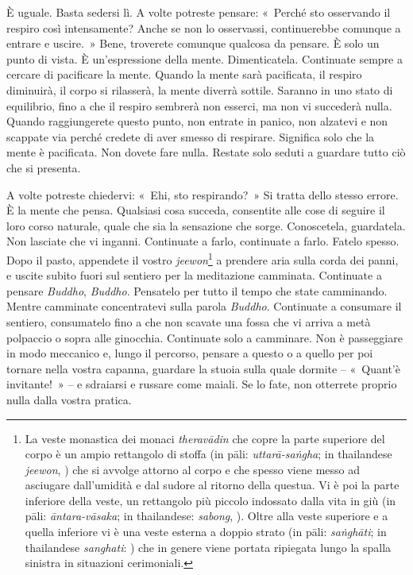 È uguale. Basta sedersi lì. A volte potreste pensare: «~Perché sto
osservando il respiro così intensamente? Anche se non lo osservassi,
continuerebbe comunque a entrare e uscire.~» Bene, troverete comunque
qualcosa da pensare. È solo un punto di vista. È un'espressione della
mente. Dimenticatela. Continuate sempre a cercare di pacificare la
mente. Quando la mente sarà pacificata, il respiro diminuirà, il corpo
si rilasserà, la mente diverrà sottile. Saranno in uno stato di
equilibrio, fino a che il respiro sembrerà non esserci, ma non vi
succederà nulla. Quando raggiungerete questo punto, non entrate in
panico, non alzatevi e non scappate via perché credete di aver smesso di
respirare. Significa solo che la mente è pacificata. Non dovete fare
nulla. Restate solo seduti a guardare tutto ciò che si presenta.

A volte potreste chiedervi: «~Ehi, sto respirando?~» Si tratta dello
stesso errore. È la mente che pensa. Qualsiasi cosa succeda, consentite
alle cose di seguire il loro corso naturale, quale che sia la sensazione
che sorge. Conoscetela, guardatela. Non lasciate che vi inganni.
Continuate a farlo, continuate a farlo. Fatelo spesso. Dopo il pasto,
appendete il vostro \emph{jeewon}\footnote{La veste monastica dei monaci
  \emph{theravādin} che copre la parte superiore del corpo è un ampio
  rettangolo di stoffa (in pāli: \emph{uttarā-saṅgha}; in thailandese
  \emph{jeewon}, ) che si avvolge attorno al corpo e che spesso
  viene messo ad asciugare dall'umidità e dal sudore al ritorno della
  questua. Vi è poi la parte inferiore della veste, un rettangolo più
  piccolo indossato dalla vita in giù (in pāli: \emph{āntara-vāsaka}; in
  thailandese: \emph{sabong}, ). Oltre alla veste superiore e a
  quella inferiore vi è una veste esterna a doppio strato (in pāli:
  \emph{saṅghāti}; in thailandese \emph{sanghati}: ) che in
  genere viene portata ripiegata lungo la spalla sinistra in situazioni
  cerimoniali.} a prendere aria sulla corda dei panni, e uscite subito
fuori sul sentiero per la meditazione camminata. Continuate a pensare
\emph{Buddho}, \emph{Buddho}. Pensatelo per tutto il tempo che state
camminando. Mentre camminate concentratevi sulla parola \emph{Buddho}.
Continuate a consumare il sentiero, consumatelo fino a che non scavate
una fossa che vi arriva a metà polpaccio o sopra alle ginocchia.
Continuate solo a camminare. Non è passeggiare in modo meccanico e,
lungo il percorso, pensare a questo o a quello per poi tornare nella
vostra capanna, guardare la stuoia sulla quale dormite -- «~Quant'è
invitante!~» -- e sdraiarsi e russare come maiali. Se lo fate, non
otterrete proprio nulla dalla vostra pratica.

